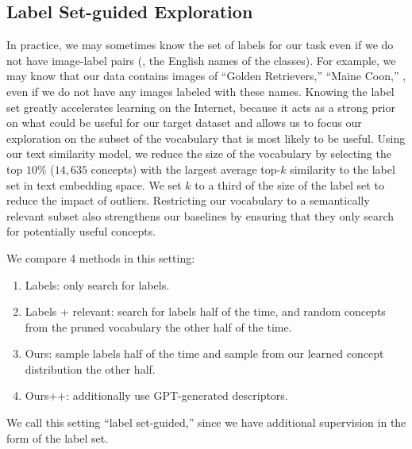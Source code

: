 \subsection{Label Set-guided Exploration}
In practice, we may sometimes know the set of labels for our task even if we do not have image-label pairs (\ie, the English names of the classes).
For example, we may know that our data contains images of ``Golden Retrievers,'' ``Maine Coon,'' \etc, even if we do not have any images labeled with these names.
Knowing the label set greatly accelerates learning on the Internet, because it acts as a strong prior on what could be useful for our target dataset and allows us to focus our exploration on the subset of the vocabulary that is most likely to be useful.
Using our text similarity model, we reduce the size of the vocabulary by selecting the top 
$10\%$ ($14{,}635$ concepts)
with the largest average top-$k$ similarity to the label set in text embedding space. We set $k$ to a third of the size of the label set to reduce the impact of outliers.
Restricting our vocabulary to a semantically relevant subset also strengthens our baselines by ensuring that they only search for potentially useful concepts.

We compare 4 methods in this setting:
\begin{enumerate}[noitemsep,topsep=0pt]
    \item Labels: only search for labels. 
    \item Labels + relevant: search for labels half of the time, and random concepts from the pruned vocabulary the other half of the time. 
    \item Ours: sample labels half of the time and sample from our learned concept distribution the other half. 
    \item Ours++: additionally use GPT-generated descriptors.
\end{enumerate}
We call this setting ``label set-guided,'' since we have additional supervision in the form of the label set.

